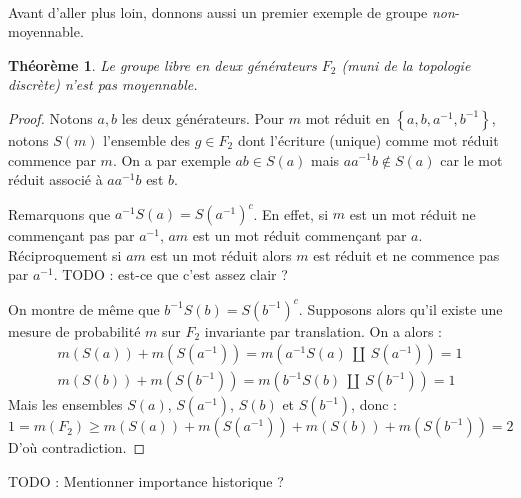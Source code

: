 \documentclass[a4paper,12pt]{article}
\newtheorem{theorem}{Théorème}[section]
\newcommand{\set}[1]{\left\{ #1 \right\}}
\newcommand{\inv}{^{-1}}
\newcommand{\compl}{^c}
\newcommand{\TODO}[1]{{\color{red}TODO :} #1}
\begin{document}
\paragraph{}

Avant d'aller plus loin, donnons aussi un premier exemple de groupe \emph{non}-moyennable.

\begin{theorem}\label{not_amenable_F2}
    Le groupe libre en deux générateurs $F_2$ (muni de la topologie discrète) n'est pas moyennable.
\end{theorem}

\begin{proof}
    Notons $a, b$ les deux générateurs. Pour $m$ mot réduit en $\set{a, b, a\inv, b\inv}$, notons 
    $S(m)$ l'ensemble des $g\in F_2$ dont l'écriture (unique) comme mot réduit
    commence par $m$. On a par exemple $ab\in S(a)$ mais $a a\inv b \notin S(a)$ car le mot réduit associé 
    à $a a\inv b$ est $b$.

    Remarquons que $a\inv S(a) = S(a\inv)\compl$. En effet, si $m$ est un mot réduit ne commençant pas par $a\inv$, 
    $am$ est un mot réduit commençant par $a$. Réciproquement si $am$ est un mot réduit alors $m$ est réduit et ne commence 
    pas par $a\inv$. \TODO{est-ce que c'est assez clair ?}

    On montre de même que $b\inv S(b) = S(b\inv)\compl$. Supposons alors qu'il existe une mesure de probabilité $m$ sur 
    $F_2$ invariante par translation. On a alors :
    \begin{gather*}
        m(S(a)) + m(S(a\inv)) = m(a\inv S(a)\ \amalg\ S(a\inv)) = 1 \\
        m(S(b)) + m(S(b\inv)) = m(b\inv S(b)\ \amalg\ S(b\inv)) = 1
    \end{gather*}
    Mais les ensembles $S(a)$, $S(a\inv)$, $S(b)$ et $S(b\inv)$, donc :
    \begin{equation*}
        1 = m(F_2) \ge m(S(a)) + m(S(a\inv)) + m(S(b)) + m(S(b\inv)) = 2
    \end{equation*} 
    D'où contradiction.
\end{proof}

\TODO{Mentionner importance historique ?}

\paragraph{}
\end{document}
